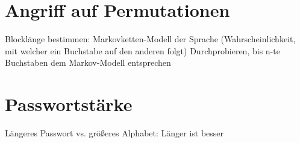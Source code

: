\section{Angriff auf Permutationen}

Blocklänge bestimmen: Markovketten-Modell der Sprache (Wahrscheinlichkeit, mit welcher ein Buchstabe auf den anderen folgt)
Durchprobieren, bis n-te Buchstaben dem Markov-Modell entsprechen

\section{Passwortstärke}

Längeres Passwort vs. größeres Alphabet: Länger ist besser

